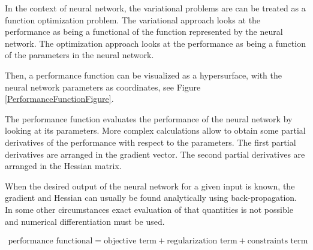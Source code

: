 In the context of neural network, the variational problems are 
can be treated as a function optimization problem. 
The variational approach looks at the performance as being a functional of the function represented by the neural network.
The optimization approach looks at the performance as being a function of the parameters in the neural network.  

Then, a performance function can be visualized as a hypersurface,
with the neural network parameters as coordinates, see Figure
\ref{PerformanceFunctionFigure}.

The performance function evaluates the performance of the neural network by looking at its parameters. 
More complex calculations allow to obtain some partial derivatives of the performance with respect to the parameters.
The first partial derivatives are arranged in the gradient vector. The second partial derivatives are arranged in the Hessian matrix. 

When the desired output of the neural network for a given
input is known, the gradient and Hessian can usually be found
analytically using back-propagation. In some other circumstances
exact evaluation of that quantities is not possible and numerical
differentiation must be used.

\begin{eqnarray}\nonumber
\text{performance functional} =  \text{objective term} + \text{regularization term} + \text{constraints term}
\end{eqnarray}

